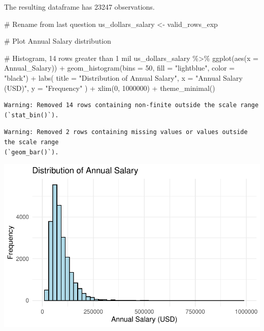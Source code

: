 \documentclass[
  letterpaper,
  DIV=11,
  numbers=noendperiod]{scrartcl}
\newenvironment{Shaded}{\begin{snugshade}}{\end{snugshade}}
\newcommand{\AttributeTok}[1]{\textcolor[rgb]{0.40,0.45,0.13}{#1}}
\newcommand{\CommentTok}[1]{\textcolor[rgb]{0.37,0.37,0.37}{#1}}
\newcommand{\DecValTok}[1]{\textcolor[rgb]{0.68,0.00,0.00}{#1}}
\newcommand{\FunctionTok}[1]{\textcolor[rgb]{0.28,0.35,0.67}{#1}}
\newcommand{\NormalTok}[1]{\textcolor[rgb]{0.00,0.23,0.31}{#1}}
\newcommand{\OtherTok}[1]{\textcolor[rgb]{0.00,0.23,0.31}{#1}}
\newcommand{\SpecialCharTok}[1]{\textcolor[rgb]{0.37,0.37,0.37}{#1}}
\newcommand{\StringTok}[1]{\textcolor[rgb]{0.13,0.47,0.30}{#1}}
\begin{document}
The resulting dataframe has 23247 observations.

\begin{Shaded}
\begin{Highlighting}[]
\CommentTok{\# Rename from last question}
\NormalTok{us\_dollars\_salary }\OtherTok{\textless{}{-}}\NormalTok{ valid\_rows\_exp}

\CommentTok{\# Plot Annual Salary distribution}

\CommentTok{\# Histogram, 14 rows greater than 1 mil}
\NormalTok{us\_dollars\_salary }\SpecialCharTok{\%\textgreater{}\%}
  \FunctionTok{ggplot}\NormalTok{(}\FunctionTok{aes}\NormalTok{(}\AttributeTok{x =}\NormalTok{ Annual\_Salary)) }\SpecialCharTok{+}
  \FunctionTok{geom\_histogram}\NormalTok{(}\AttributeTok{bins =} \DecValTok{50}\NormalTok{, }\AttributeTok{fill =} \StringTok{"lightblue"}\NormalTok{, }\AttributeTok{color =} \StringTok{"black"}\NormalTok{) }\SpecialCharTok{+}
  \FunctionTok{labs}\NormalTok{(}
    \AttributeTok{title =} \StringTok{"Distribution of Annual Salary"}\NormalTok{,}
    \AttributeTok{x =} \StringTok{"Annual Salary (USD)"}\NormalTok{,}
    \AttributeTok{y =} \StringTok{"Frequency"}
\NormalTok{  ) }\SpecialCharTok{+}
  \FunctionTok{xlim}\NormalTok{(}\DecValTok{0}\NormalTok{, }\DecValTok{1000000}\NormalTok{) }\SpecialCharTok{+} 
  \FunctionTok{theme\_minimal}\NormalTok{()}
\end{Highlighting}
\end{Shaded}

\begin{verbatim}
Warning: Removed 14 rows containing non-finite outside the scale range
(`stat_bin()`).
\end{verbatim}

\begin{verbatim}
Warning: Removed 2 rows containing missing values or values outside the scale range
(`geom_bar()`).
\end{verbatim}

\includegraphics{PS1_files/figure-pdf/unnamed-chunk-15-1.pdf}
\end{document}
